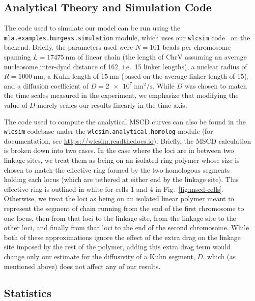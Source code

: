 \documentclass[9pt,twocolumn,twoside,lineno]{pnas-new}
\begin{document}
\subsection*{Analytical Theory and Simulation Code}

The code used to simulate our model can be run using the
\texttt{mla.examples.burgess.simulation} module, which uses our \texttt{wlcsim}
code~\cite{macpherson2018} on the backend. Briefly, the parameters used were $N
= 101$ beads per chromosome spanning $L = \SI{17475}{\nano\meter}$ of linear
chain (the length of ChrV assuming an average nucleosome inter-dyad distance of \SI{162}{\basepair}, i.e.\ \SI{15}{\basepair} linker lengths), a nuclear
radius of $R = \SI{1000}{\nano\meter}$, a Kuhn length of
$\SI{15}{\nano\meter}$ (based on the average linker length of \SI{15}{\basepair}\cite{beltran2019}), and a diffusion coefficient of $D =
\SI{2e7}{\nano\meter\squared\per\second}$. While $D$ was chosen to match the time scales measured in the experiment, we emphasize that modifying the value of $D$ merely scales our results linearly in the time axis.

The code used to compute the analytical MSCD curves can also be found in the
\texttt{wlcsim} codebase under the \texttt{wlcsim.analytical.homolog} module (for documentation, see \url{https://wlcsim.readthedocs.io}). Briefly, the MSCD calculation is broken down into two cases. In the case where the loci are in between two linkage sites, we treat them as being on an isolated ring polymer whose size is chosen to match the effective ring formed by the two homologous segments holding each locus (which are tethered at either end by the linkage site). This effective ring is outlined in white for cells 1 and 4 in Fig.~\ref{fig:mscd-cells}.
Otherwise, we treat the loci as being on an isolated linear polymer meant to represent the segment of chain running from the end of the first chromosome to one locus, then from that loci to the linkage site, from the linkage site to the other loci, and finally from that loci to the end of the second chromosome.
While both of these approximations ignore the effect of the extra drag on the linkage site imposed by the rest of the polymer, adding this extra drag term would change only our estimate for the diffusivity of a Kuhn segment, $D$, which (as mentioned above) does not affect any of our results.

\subsection*{Statistics}
\end{document}
